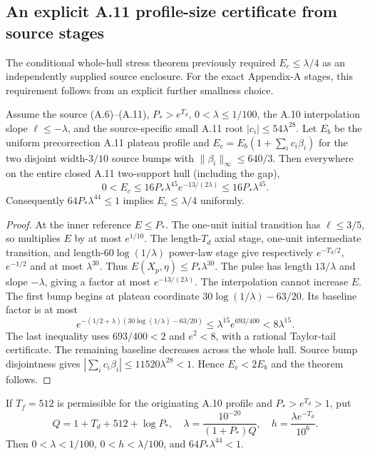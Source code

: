 \subsection*{An explicit A.11 profile-size certificate from source stages}
\label{subsec:a11-explicit-profile-size-20261022}
The conditional whole-hull stress theorem previously required
$E_c\le\lambda/4$ as an independently supplied source enclosure.
For the exact Appendix-A stages, this requirement follows from
an explicit further smallness choice.

\begin{proposition}
\label{prop:a11-source-E-small-20261022}
Assume the source (A.6)--(A.11), $P_*>e^{T_d}$,
$0<\lambda\le1/100$, the A.10 interpolation slope
$\ell\le-\lambda$, and the source-specific small A.11
root $|c_i|\le54\lambda^{28}$. Let $E_b$ be the uniform
precorrection A.11 plateau profile and
$E_c=E_b(1+\sum_i c_i\beta_i)$ for the two disjoint
width-$3/10$ source bumps with
$\|\beta_i\|_\infty\le640/3$.
Then everywhere on the entire closed A.11 two-support
hull (including the gap),
\[
0<E_c\le16P_*\lambda^{45}e^{-13/(2\lambda)}
\le16P_*\lambda^{45}.
\]
Consequently $64P_*\lambda^{44}\le1$ implies
$E_c\le\lambda/4$ uniformly.
\end{proposition}
\begin{proof}
At the inner reference $E\le P_*$. The one-unit initial
transition has $\ell\le3/5$, so multiplies $E$ by at most
$e^{1/10}$. The length-$T_d$ axial stage, one-unit
intermediate transition, and length-$60\log(1/\lambda)$
power-law stage give respectively $e^{-T_d/2}$,
$e^{-1/2}$ and at most $\lambda^{30}$.
Thus $E(X_p,\eta)\le P_*\lambda^{30}$.
The pulse has length $13/\lambda$ and slope $-\lambda$,
giving a factor at most $e^{-13/(2\lambda)}$.
The interpolation cannot increase $E$.
The first bump begins at plateau coordinate
$30\log(1/\lambda)-63/20$. Its baseline factor is at most
\[
e^{-(1/2+\lambda)(30\log(1/\lambda)-63/20)}
\le\lambda^{15}e^{693/400}<8\lambda^{15}.
\]
The last inequality uses $693/400<2$ and $e^2<8$,
with a rational Taylor-tail certificate.
The remaining baseline decreases across the whole hull.
Source bump disjointness gives
$|\sum_i c_i\beta_i|\le11520\lambda^{28}<1$.
Hence $E_c<2E_b$ and the theorem follows.
\end{proof}
\begin{corollary}
\label{cor:a11-explicit-lambda-20261022}
If $T_f=512$ is permissible for the originating
A.10 profile and $P_*>e^{T_d}>1$, put
\[
Q=1+T_d+512+\log P_*,
\quad
\lambda=\frac{10^{-20}}{(1+P_*)Q},
\quad
h=\frac{\lambda e^{-T_d}}{10^6}.
\]
Then $0<\lambda<1/100$, $0<h<\lambda/100$, and
$64P_*\lambda^{44}<1$.
\end{corollary}
